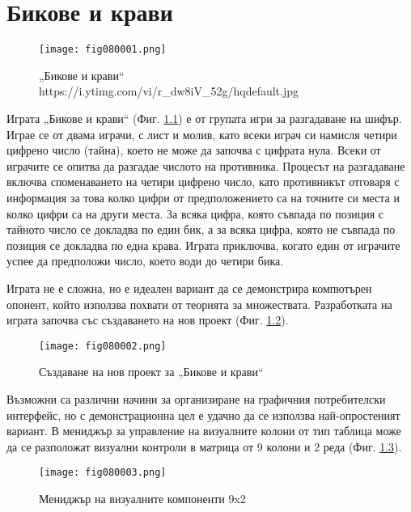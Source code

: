 ﻿\chapter{Бикове и крави}

\begin{figure}[H]
  \centering
  \texttt{[image: fig080001.png]}
  \caption{„Бикове и крави“ \\ https://i.ytimg.com/vi/r\_dw8iV\_52g/hqdefault.jpg}
\label{fig080001}
\end{figure}

Играта „Бикове и крави“ (Фиг. \ref{fig080001}) е от групата игри за разгадаване на шифър. Играе се от двама играчи, с лист и молив, като всеки играч си намисля четири цифрено число (тайна), което не може да започва с цифрата нула. Всеки от играчите се опитва да разгадае числото на противника. Процесът на разгадаване включва споменаването на четири цифрено число, като противникът отговаря с информация за това колко цифри от предположението са на точните си места и колко цифри са на други места. За всяка цифра, която съвпада по позиция с тайното число се докладва по един бик, а за всяка цифра, която не съвпада по позиция се докладва по една крава. Играта приключва, когато един от играчите успее да предположи число, което води до четири бика. 

Играта не е сложна, но е идеален вариант да се демонстрира компютърен опонент, който използва похвати от теорията за множествата. Разработката на играта започва със създаването на нов проект (Фиг. \ref{fig080002}).

\begin{figure}[H]
  \centering
  \texttt{[image: fig080002.png]}
  \caption{Създаване на нов проект за „Бикове и крави“}
\label{fig080002}
\end{figure}

Възможни са различни начини за организиране на графичния потребителски интерфейс, но с демонстрационна цел е удачно да се използва най-опростеният вариант. В мениджър за управление на визуалните колони от тип таблица може да се разположат визуални контроли в матрица от 9 колони и 2 реда (Фиг. \ref{fig080003}).

\begin{figure}[H]
  \centering
  \texttt{[image: fig080003.png]}
  \caption{Мениджър на визуалните компоненти 9x2}
\label{fig080003}
\end{figure}

